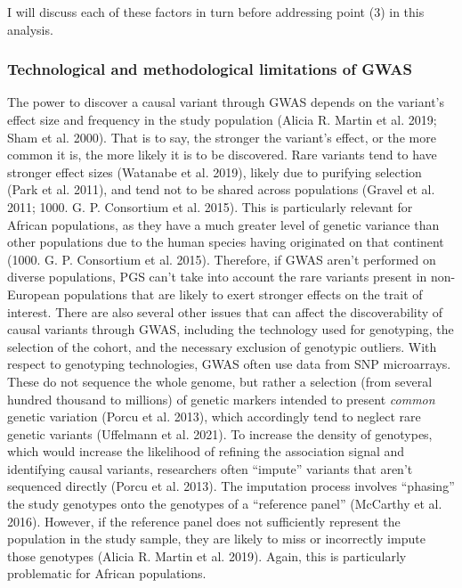 \documentclass[
]{book}
\begin{document}
I will discuss each of these factors in turn before addressing point (3) in this analysis.

\hypertarget{fst-discovery-sec}{%
\subsubsection{Technological and methodological limitations of GWAS}\label{fst-discovery-sec}}

The power to discover a causal variant through GWAS depends on the variant's effect size and frequency in the study population (Alicia R. Martin et al. 2019; Sham et al. 2000). That is to say, the stronger the variant's effect, or the more common it is, the more likely it is to be discovered. Rare variants tend to have stronger effect sizes (Watanabe et al. 2019), likely due to purifying selection (Park et al. 2011), and tend not to be shared across populations (Gravel et al. 2011; 1000. G. P. Consortium et al. 2015). This is particularly relevant for African populations, as they have a much greater level of genetic variance than other populations due to the human species having originated on that continent (1000. G. P. Consortium et al. 2015). Therefore, if GWAS aren't performed on diverse populations, PGS can't take into account the rare variants present in non-European populations that are likely to exert stronger effects on the trait of interest. There are also several other issues that can affect the discoverability of causal variants through GWAS, including the technology used for genotyping, the selection of the cohort, and the necessary exclusion of genotypic outliers.
With respect to genotyping technologies, GWAS often use data from SNP microarrays. These do not sequence the whole genome, but rather a selection (from several hundred thousand to millions) of genetic markers intended to present \emph{common} genetic variation (Porcu et al. 2013), which accordingly tend to neglect rare genetic variants (Uffelmann et al. 2021). To increase the density of genotypes, which would increase the likelihood of refining the association signal and identifying causal variants, researchers often ``impute'' variants that aren't sequenced directly (Porcu et al. 2013). The imputation process involves ``phasing'' the study genotypes onto the genotypes of a ``reference panel'' (McCarthy et al. 2016). However, if the reference panel does not sufficiently represent the population in the study sample, they are likely to miss or incorrectly impute those genotypes (Alicia R. Martin et al. 2019). Again, this is particularly problematic for African populations.
\end{document}
